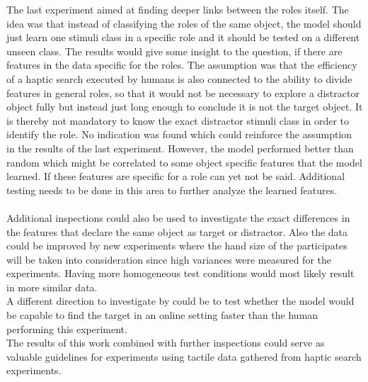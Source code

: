 The last experiment aimed at finding deeper links between the roles itself. The idea was that instead of classifying the roles of the same object, the model should just learn one stimuli class in a specific role and it should be tested on a different unseen class. The results would give some insight to the question, if there are features in the data specific for the roles. The assumption was that the efficiency of a haptic search executed by humans is also connected to the ability to divide features in general roles, so that it would not be necessary to explore a distractor object fully but instead just long enough to conclude it is not the target object. It is thereby not mandatory to know the exact distractor stimuli class in order to identify the role. No indication was found which could reinforce the assumption in the results of the last experiment. However, the model performed better than random which might be correlated to some object specific features that the model learned. If these features are specific for a role can yet not be said. Additional testing needs to be done in this area to further analyze the learned features.\\\\
Additional inspections could also be used to investigate the exact differences in the features that declare the same object as target or distractor. Also the data could be improved by new experiments where the hand size of the participates will be taken into consideration since high variances were measured for the experiments. Having more homogeneous test conditions would most likely result in more similar data. \\
A different direction to investigate by could be to test whether the model would be capable to find the target in an online setting faster than the human performing this experiment. \\
The results of this work combined with further inspections could serve as valuable guidelines for experiments using tactile data gathered from haptic search experiments.